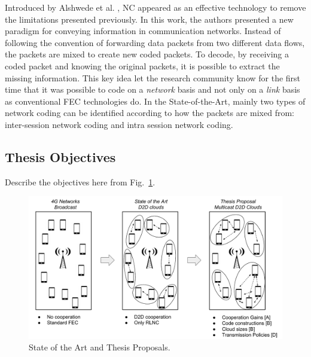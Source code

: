 Introduced by Alshwede et al. \cite{ahlswede2000network}, \ac{NC} appeared as an effective technology to remove the limitations presented previously. In this work, the authors presented a new paradigm for conveying information in communication networks. Instead of following the convention of forwarding data packets from two different data flows, the packets are mixed to create new coded packets. To decode, by receiving a coded packet and knowing the original packets, it is possible to extract the missing information. This key idea let the research community know for the first time that it was possible to code on a \textit{network} basis and not only on a \textit{link} basis as conventional \ac{FEC} technologies do. In the State-of-the-Art, mainly two types of network coding can be identified according to how the packets are mixed from: inter-session network coding and intra session network coding. 

\subsection{Thesis Objectives}
Describe the objectives here from Fig.~\ref{fig:proposal}.

\begin{figure}
  \centering 
  \includegraphics[width=\textwidth]{introduction/figures/thesis-diagrams.pdf}
  \caption{State of the Art and Thesis Proposals.}
\label{fig:proposal}
\end{figure} 
